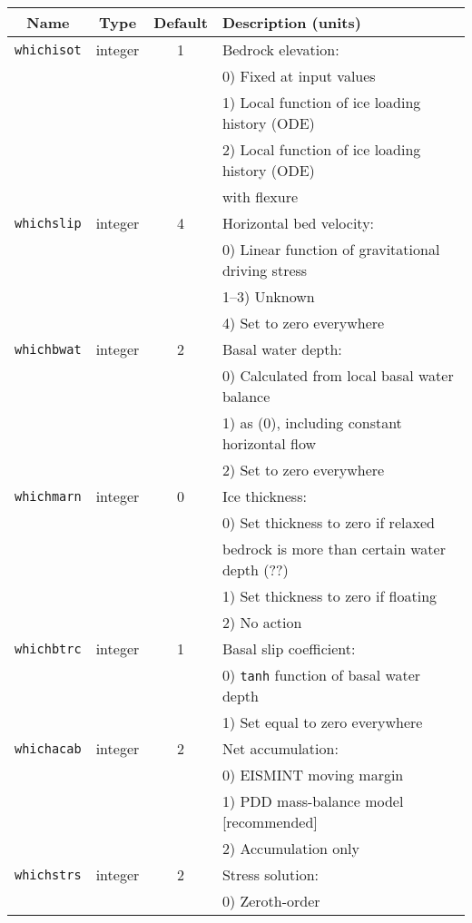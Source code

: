 \begin{center}
\begin{tabular}{|c|c|c|l|}
\hline
Name & Type & Default & Description (units)\\
\hline
\hline
\texttt{whichisot} & integer & 1 & Bedrock elevation: \\
 & & & 0) Fixed at input values \\
 & & & 1) Local function of ice loading history (ODE) \\
 & & & 2) Local function of ice loading history (ODE) \\
 & & & with flexure \\
\hline 
\texttt{whichslip} & integer & 4 & Horizontal bed velocity: \\
 & & & 0) Linear function of gravitational driving stress \\
 & & & 1--3) Unknown \\
 & & & 4) Set to zero everywhere \\
\hline
\texttt{whichbwat} & integer & 2 & Basal water depth: \\
 & & & 0) Calculated from local basal water balance \\
 & & & 1) as (0), including constant horizontal flow \\
 & & & 2) Set to zero everywhere \\
\hline
\texttt{whichmarn} & integer & 0 & Ice thickness: \\
 & & & 0) Set thickness to zero if relaxed \\
 & & & bedrock is more than certain water depth (??) \\
 & & & 1) Set thickness to zero if floating \\
 & & & 2) No action \\
\hline
\texttt{whichbtrc} & integer & 1 & Basal slip coefficient: \\
 & & & 0) \texttt{tanh} function of basal water depth \\
 & & & 1) Set equal to zero everywhere \\
\hline
\texttt{whichacab} & integer & 2 & Net accumulation: \\
 & & & 0) EISMINT moving margin \\
 & & & 1) PDD mass-balance model [recommended] \\
 & & & 2) Accumulation only \\
\hline
\texttt{whichstrs} & integer & 2 & Stress solution: \\
 & & & 0) Zeroth-order \\

\end{tabular}
\end{center}
